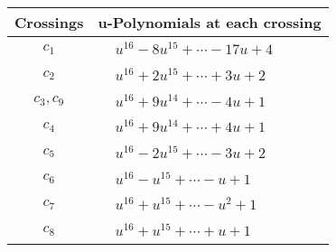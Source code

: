 \documentclass[1p]{elsarticle_modified}
\theoremstyle{definition}
\begin{document}
\begin{tabular}{m{50pt}|m{274pt}}
Crossings & \hspace{64pt}u-Polynomials at each crossing \\
\hline $$\begin{aligned}c_{1}\end{aligned}$$&$\begin{aligned}
&u^{16}-8 u^{15}+\cdots-17 u+4
\end{aligned}$\\
\hline $$\begin{aligned}c_{2}\end{aligned}$$&$\begin{aligned}
&u^{16}+2 u^{15}+\cdots+3 u+2
\end{aligned}$\\
\hline $$\begin{aligned}c_{3},c_{9}\end{aligned}$$&$\begin{aligned}
&u^{16}+9 u^{14}+\cdots-4 u+1
\end{aligned}$\\
\hline $$\begin{aligned}c_{4}\end{aligned}$$&$\begin{aligned}
&u^{16}+9 u^{14}+\cdots+4 u+1
\end{aligned}$\\
\hline $$\begin{aligned}c_{5}\end{aligned}$$&$\begin{aligned}
&u^{16}-2 u^{15}+\cdots-3 u+2
\end{aligned}$\\
\hline $$\begin{aligned}c_{6}\end{aligned}$$&$\begin{aligned}
&u^{16}- u^{15}+\cdots- u+1
\end{aligned}$\\
\hline $$\begin{aligned}c_{7}\end{aligned}$$&$\begin{aligned}
&u^{16}+u^{15}+\cdots- u^2+1
\end{aligned}$\\
\hline $$\begin{aligned}c_{8}\end{aligned}$$&$\begin{aligned}
&u^{16}+u^{15}+\cdots+u+1
\end{aligned}$\\

\end{tabular}
\end{document}
